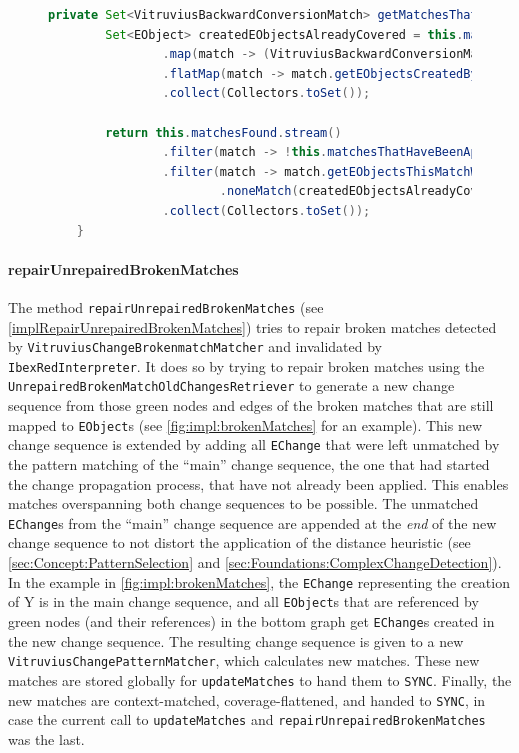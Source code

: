 \begin{figure}[H]
\centering
\begin{lstlisting}[language=java, caption={Match filtering in \texttt{VitruviusBackwardConversionTGGEngine}}, captionpos=b, label=implGetMatchesThatHaventBeenAppliedAndAreStillIntact]
private Set<VitruviusBackwardConversionMatch> getMatchesThatHaventBeenAppliedAndAreStillIntact() {
        Set<EObject> createdEObjectsAlreadyCovered = this.matchesThatHaveBeenApplied.stream()
                .map(match -> (VitruviusBackwardConversionMatch) match)
                .flatMap(match -> match.getEObjectsCreatedByThisMatch().stream())
                .collect(Collectors.toSet());

        return this.matchesFound.stream()
                .filter(match -> !this.matchesThatHaveBeenApplied.contains(match))
                .filter(match -> match.getEObjectsThisMatchWouldCreate().stream()
                        .noneMatch(createdEObjectsAlreadyCovered::contains))
                .collect(Collectors.toSet());
    }
\end{lstlisting}
\end{figure}

\paragraph{repairUnrepairedBrokenMatches} The method \texttt{repairUnrepairedBrokenMatches} (see \autoref{implRepairUnrepairedBrokenMatches}) tries to repair broken matches detected by \texttt{VitruviusChangeBrokenmatchMatcher} and invalidated by \texttt{IbexRedInterpreter}.
It does so by trying to repair broken matches using the \texttt{UnrepairedBrokenMatchOldChangesRetriever} to generate a new change sequence from those green nodes and edges of the broken matches that are still mapped to \texttt{EObject}s (see \autoref{fig:impl:brokenMatches} for an example).
This new change sequence is extended by adding all \texttt{EChange} that were left unmatched by the pattern matching of the \enquote{main} change sequence, the one that had started the change propagation process, that have not already been applied. This enables matches overspanning both change sequences to be possible.
The unmatched \texttt{EChange}s from the \enquote{main} change sequence are appended at the \emph{end} of the new change sequence to not distort the application of the distance heuristic (see \autoref{sec:Concept:PatternSelection} and \autoref{sec:Foundations:ComplexChangeDetection}).
In the example in \autoref{fig:impl:brokenMatches}, the \texttt{EChange} representing the creation of Y is in the main change sequence, and all \texttt{EObject}s that are referenced by green nodes (and their references) in the bottom graph get \texttt{EChange}s created in the new change sequence.
The resulting change sequence is given to a new \texttt{VitruviusChangePatternMatcher}, which calculates new matches.
These new matches are stored globally for \texttt{updateMatches} to hand them to \texttt{SYNC}.
Finally, the new matches are context-matched, coverage-flattened, and handed to \texttt{SYNC}, in case the current call to \texttt{updateMatches} and \texttt{repairUnrepairedBrokenMatches} was the last.


